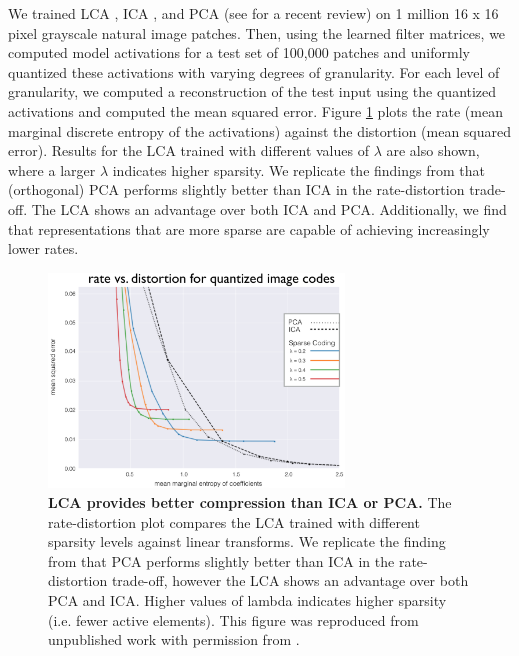 We trained LCA \parencite{rozell2008sparse}, ICA \parencite{bell1997independent}, and PCA (see \cite{jolliffe2016principal} for a recent review) on 1 million 16 x 16 pixel grayscale natural image patches.
Then, using the learned filter matrices, we computed model activations for a test set of 100,000 patches and uniformly quantized these activations with varying degrees of granularity.
For each level of granularity, we computed a reconstruction of the test input using the quantized activations and computed the mean squared error.
Figure \ref{fig:ch4_rate_distortion} plots the rate (mean marginal discrete entropy of the activations) against the distortion (mean squared error).
Results for the LCA trained with different values of $\lambda$ are also shown, where a larger $\lambda$ indicates higher sparsity.
We replicate the findings from \parencite{eichhorn2009natural} that (orthogonal) PCA  performs slightly better than ICA in the rate-distortion trade-off.
The LCA shows an advantage over both ICA and PCA.
Additionally, we find that representations that are more sparse are capable of achieving increasingly lower rates.

\begin{figure}[h]
    \centering
    \includegraphics[width=0.7\textwidth]{figures/rate_distortion.png}
    \caption{\textbf{LCA provides better compression than ICA or PCA.} The rate-distortion plot compares the LCA trained with different sparsity levels against linear transforms. We replicate the finding from \parencite{eichhorn2009natural} that PCA performs slightly better than ICA in the rate-distortion trade-off, however the LCA shows an advantage over both PCA and ICA. Higher values of lambda indicates higher sparsity (i.e. fewer active elements). This figure was reproduced from unpublished work with permission from \parencite{sanborn2016sampling}.}
    \label{fig:ch4_rate_distortion}
\end{figure}


